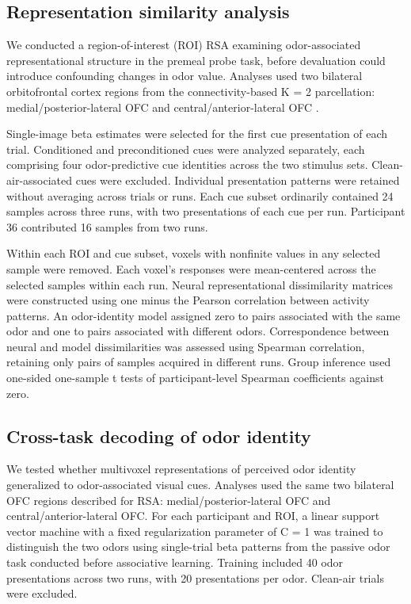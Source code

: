 \documentclass[12pt,letterpaper]{article}
\begin{document}
\subsection*{Representation similarity analysis}
\label{rsa-probe}

We conducted a region-of-interest (ROI) RSA examining odor-associated representational structure in the premeal probe task, before devaluation could introduce confounding changes in odor value. Analyses used two bilateral orbitofrontal cortex regions from the connectivity-based K = 2 parcellation: medial/posterior-lateral OFC and central/anterior-lateral OFC \cite{kahnt2012connectivity}.

Single-image beta estimates were selected for the first cue presentation of each trial. Conditioned and preconditioned cues were analyzed separately, each comprising four odor-predictive cue identities across the two stimulus sets. Clean-air-associated cues were excluded. Individual presentation patterns were retained without averaging across trials or runs. Each cue subset ordinarily contained 24 samples across three runs, with two presentations of each cue per run. Participant 36 contributed 16 samples from two runs.

Within each ROI and cue subset, voxels with nonfinite values in any selected sample were removed. Each voxel’s responses were mean-centered across the selected samples within each run. Neural representational dissimilarity matrices were constructed using one minus the Pearson correlation between activity patterns. An odor-identity model assigned zero to pairs associated with the same odor and one to pairs associated with different odors. Correspondence between neural and model dissimilarities was assessed using Spearman correlation, retaining only pairs of samples acquired in different runs. Group inference used one-sided one-sample t tests of participant-level Spearman coefficients against zero.


\subsection*{Cross-task decoding of odor identity}

We tested whether multivoxel representations of perceived odor identity generalized to odor-associated visual cues. Analyses used the same two bilateral OFC regions described for RSA: medial/posterior-lateral OFC and central/anterior-lateral OFC. For each participant and ROI, a linear support vector machine with a fixed regularization parameter of C = 1 was trained to distinguish the two odors using single-trial beta patterns from the passive odor task conducted before associative learning. Training included 40 odor presentations across two runs, with 20 presentations per odor. Clean-air trials were excluded.
\end{document}
